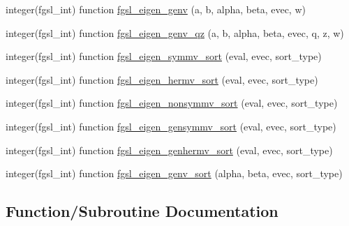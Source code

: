 \begin{DoxyCompactItemize}
integer(fgsl\+\_\+int) function \hyperlink{eigen_8finc_a091964d484996dc36d814dd6f7024885}{fgsl\+\_\+eigen\+\_\+genv} (a, b, alpha, beta, evec, w)
\item 
integer(fgsl\+\_\+int) function \hyperlink{eigen_8finc_ade5191d945be9be6f404d55ce96013c0}{fgsl\+\_\+eigen\+\_\+genv\+\_\+qz} (a, b, alpha, beta, evec, q, z, w)
\item 
integer(fgsl\+\_\+int) function \hyperlink{eigen_8finc_a4de96323ca5ee27e595f0ccc55686200}{fgsl\+\_\+eigen\+\_\+symmv\+\_\+sort} (eval, evec, sort\+\_\+type)
\item 
integer(fgsl\+\_\+int) function \hyperlink{eigen_8finc_a3367196fe5ce83a49332525cf10513ad}{fgsl\+\_\+eigen\+\_\+hermv\+\_\+sort} (eval, evec, sort\+\_\+type)
\item 
integer(fgsl\+\_\+int) function \hyperlink{eigen_8finc_a225c50506c2ef39bf0eb7efdf3d7bd29}{fgsl\+\_\+eigen\+\_\+nonsymmv\+\_\+sort} (eval, evec, sort\+\_\+type)
\item 
integer(fgsl\+\_\+int) function \hyperlink{eigen_8finc_a01fa1634183b5dd7727164f67160ee20}{fgsl\+\_\+eigen\+\_\+gensymmv\+\_\+sort} (eval, evec, sort\+\_\+type)
\item 
integer(fgsl\+\_\+int) function \hyperlink{eigen_8finc_aedab09666f98dd918fc64875cda7c972}{fgsl\+\_\+eigen\+\_\+genhermv\+\_\+sort} (eval, evec, sort\+\_\+type)
\item 
integer(fgsl\+\_\+int) function \hyperlink{eigen_8finc_a277ee7050a1e674988a7392ac9255d21}{fgsl\+\_\+eigen\+\_\+genv\+\_\+sort} (alpha, beta, evec, sort\+\_\+type)
\end{DoxyCompactItemize}


\subsection{Function/\+Subroutine Documentation}
\hypertarget{eigen_8finc_af9248a86edc3501913a04bff373f5f16}{}
